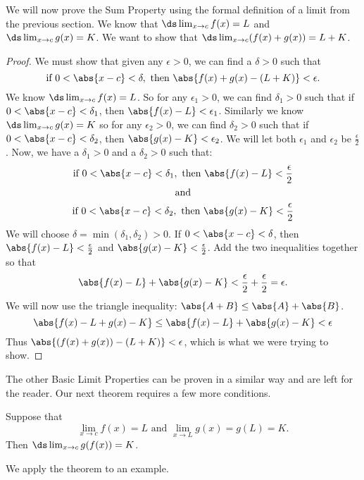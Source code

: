 We will now prove the Sum Property using the formal definition of a limit from the previous section. We know that $\ds \lim_{x\to c}f(x) = L$ and  $\ds\lim_{x\to c} g(x) = K$. We want to show that $\ds \lim_{x\to c}(f(x)+g(x))=L+K$.

\begin{proof}
We must show that given any $\epsilon>0$, we can find a $\delta>0$ such that
\[\text{if }0<\abs{x-c}<\delta,\text{ then }\abs{f(x)+g(x)-(L+K)}<\epsilon.\]
We know $\ds \lim_{x\to c}f(x) = L$. So for any $\epsilon_1 >0$, we can find $\delta_1>0$ such that if $0<\abs{x-c}<\delta_1$, then $\abs{f(x)-L}<\epsilon_1$. Similarly we know $\ds\lim_{x\to c} g(x) = K$ so for any $\epsilon_2>0$, we can find $\delta_2>0$ such that if  $0<\abs{x-c}<\delta_2$, then $\abs{g(x)-K}<\epsilon_2$. We will let both $\epsilon_1$ and $\epsilon_2$ be $\frac{\epsilon}{2}$. Now, we have a $\delta_1>0$ and a $\delta_2>0$ such that:
\begin{gather*}
\text{if }0<\abs{x-c}<\delta_1,\text{ then }\abs{f(x)-L}<\frac{\epsilon}{2} \\
\text{and} \\
\text{if }0<\abs{x-c}<\delta_2,\text{ then }\abs{g(x)-K}<\frac{\epsilon}{2}
\end{gather*}
We will choose $\delta=\min(\delta_1,\delta_2)>0$. If $0<\abs{x-c}<\delta$, then $\abs{f(x)-L}<\frac{\epsilon}{2}$ and  $\abs{g(x)-K}<\frac{\epsilon}{2}$.  Add the two inequalities together so that
\[\abs{f(x)-L}+\abs{g(x)-K}<\frac{\epsilon}{2}+\frac{\epsilon}{2}=\epsilon.\]
We will now use the triangle inequality: $\abs{A+B}\leq\abs{A}+\abs{B}$.
\[\abs{f(x)-L+g(x)-K}\leq\abs{f(x)-L}+\abs{g(x)-K}<\epsilon\]
Thus $\abs{(f(x)+g(x))-(L+K)}<\epsilon$, which is what we were trying to show.
\end{proof}

The other Basic Limit Properties can be proven in a similar way and are left for the reader.  Our next theorem requires a few more conditions.

\begin{theorem}\label{thm:limit_composition}
Suppose that
\[\lim_{x\to c}f(x)=L\text{ and }\lim_{x\to L}g(x)=g(L)=K.\]
Then $\ds\lim_{x\to c}g(f(x))=K$.
\end{theorem}


We apply the theorem to an example.


